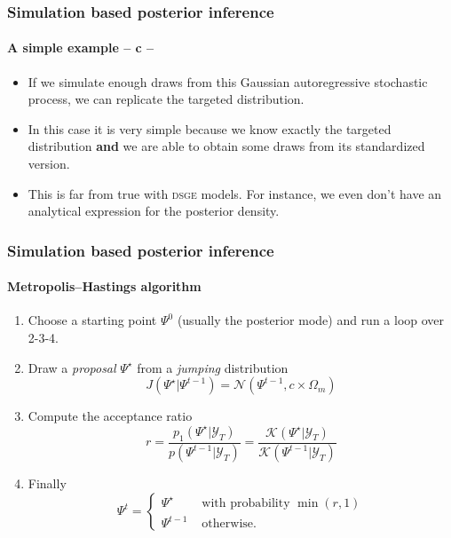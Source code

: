 \documentclass[10pt,slidestop]{beamer}
\newcommand{\sample}{\mathcal Y_T}
\begin{document}
\begin{frame}
  \frametitle{Simulation based posterior inference}
  \framesubtitle{A simple example -- c --}

    \begin{itemize}
        \item If we simulate enough draws from this Gaussian
        autoregressive stochastic process, we can replicate the
        targeted distribution.

\bigskip

        \item In this case it is very simple because we know exactly
        the targeted distribution \textbf{and} we are able to obtain
        some draws from its standardized version.

\bigskip

        \item This is far from true with \textsc{dsge} models. For
        instance, we even don't have an analytical expression for
        the posterior density.

    \end{itemize}

\end{frame}


\begin{frame}
  \frametitle{Simulation based posterior inference}
  \framesubtitle{Metropolis--Hastings algorithm}

    \begin{enumerate}
    \item Choose a starting point $\Psi^0$ (usually the posterior
      mode) and run a loop over 2-3-4.

\bigskip

        \item Draw a \emph{proposal} $\Psi^{\star}$ from a \emph{jumping} distribution
        \[
            J(\Psi^{\star}|\Psi^{t-1}) =
            \mathcal N(\Psi^{t-1},c\times\Omega_{m})
        \]

\bigskip

        \item Compute the acceptance ratio
        \[
            r = \frac{p_1(\Psi^{\star}|\sample)}{p(\Psi^{t-1}|\sample)} = \frac{\mathcal
            K(\Psi^{\star}|\sample)}{\mathcal K(\Psi^{t-1}|\sample)}
        \]

\bigskip

        \item Finally
        \[
            \Psi^t = \left\{
            \begin{array}{ll}
                \Psi^{\star} & \mbox{ with probability $\min(r,1)$}\\
                \Psi^{t-1} & \mbox{ otherwise.}
            \end{array}\right.
        \]
    \end{enumerate}
\end{frame}
\end{document}
